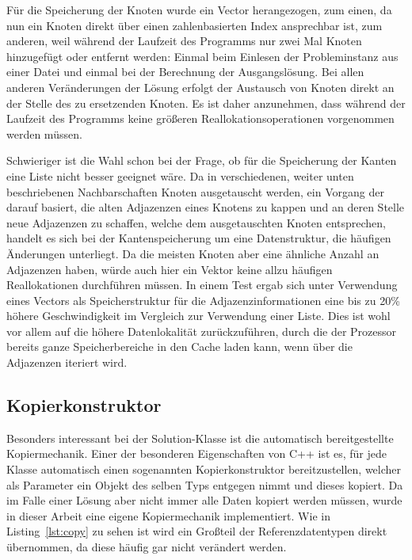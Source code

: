 Für die Speicherung der Knoten wurde ein Vector herangezogen, zum einen, da nun ein Knoten direkt über einen zahlenbasierten Index ansprechbar ist, zum anderen, weil während der Laufzeit des Programms nur
zwei Mal Knoten hinzugefügt oder entfernt werden: Einmal beim Einlesen der Probleminstanz aus einer Datei und einmal bei der Berechnung der Ausgangslösung. Bei allen anderen Veränderungen der Lösung erfolgt
der Austausch von Knoten direkt an der Stelle des zu ersetzenden Knoten. Es ist daher anzunehmen, dass während der Laufzeit des Programms keine größeren Reallokationsoperationen vorgenommen werden müssen.

Schwieriger ist die Wahl schon bei der Frage, ob für die Speicherung der Kanten eine Liste nicht besser geeignet wäre. Da in verschiedenen, weiter unten beschriebenen Nachbarschaften Knoten ausgetauscht werden,
ein Vorgang der darauf basiert, die alten Adjazenzen eines Knotens zu kappen und an deren Stelle neue Adjazenzen zu schaffen, welche dem ausgetauschten Knoten entsprechen, handelt es sich bei der Kantenspeicherung
um eine Datenstruktur, die häufigen Änderungen unterliegt. Da die meisten Knoten aber eine ähnliche Anzahl an Adjazenzen haben, würde auch hier ein Vektor keine allzu häufigen Reallokationen durchführen müssen.
In einem Test ergab sich unter Verwendung eines Vectors als Speicherstruktur für die Adjazenzinformationen eine bis zu 20\% höhere Geschwindigkeit im Vergleich zur Verwendung einer Liste. Dies ist wohl vor allem
auf die höhere Datenlokalität zurückzuführen, durch die der Prozessor bereits ganze Speicherbereiche in den Cache laden kann, wenn über die Adjazenzen iteriert wird.

\subsection{Kopierkonstruktor}
\label{sec:copy}

Besonders interessant bei der Solution-Klasse ist die automatisch bereitgestellte Kopiermechanik. Einer der besonderen Eigenschaften von C++ ist es, für jede Klasse automatisch einen sogenannten Kopierkonstruktor
bereitzustellen, welcher als Parameter ein Objekt des selben Typs entgegen nimmt und dieses kopiert. Da im Falle einer Lösung aber nicht immer alle Daten kopiert werden müssen, wurde in dieser Arbeit eine
eigene Kopiermechanik implementiert. Wie in Listing~\ref{lst:copy} zu sehen ist wird ein Großteil der Referenzdatentypen direkt übernommen, da diese häufig gar nicht verändert werden. 

